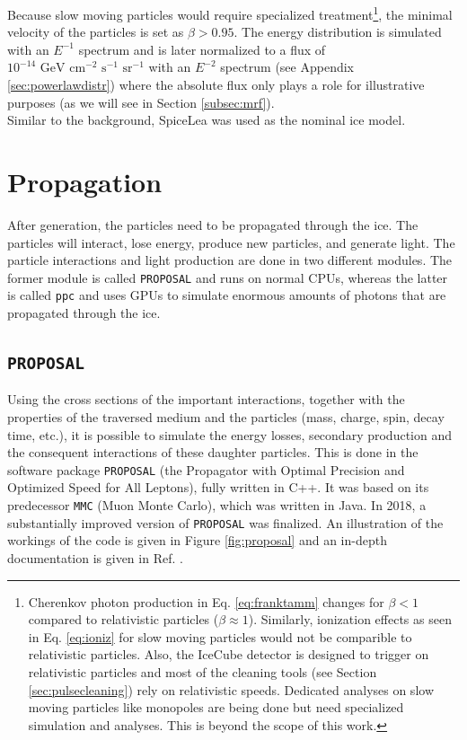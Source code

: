 \noindent Because slow moving particles would require specialized treatment\footnote{Cherenkov photon production in Eq. \ref{eq:franktamm} changes for $\beta < 1$ compared to relativistic particles ($\beta \approx 1$). Similarly, ionization effects as seen in Eq. \ref{eq:ioniz} for slow moving particles would not be comparible to relativistic particles. Also, the IceCube detector is designed to trigger on relativistic particles and most of the cleaning tools (see Section \ref{sec:pulsecleaning}) rely on relativistic speeds. Dedicated analyses on slow moving particles like monopoles are being done but need specialized simulation and analyses. This is beyond the scope of this work.}, the minimal velocity of the particles is set as $\beta > 0.95$. The energy distribution is simulated with an $E^{-1}$ spectrum and is later normalized to a flux of $10^{-14} \textrm{ GeV } \textrm{cm}^{-2} \textrm{ s}^{-1} \textrm{ sr}^{-1}$ with an $E^{-2}$ spectrum (see Appendix \ref{sec:powerlawdistr}) where the absolute flux only plays a role for illustrative purposes (as we will see in Section \ref{subsec:mrf}).\\

\noindent Similar to the background, SpiceLea was used as the nominal ice model.

\section{Propagation}
After generation, the particles need to be propagated through the ice. The particles will interact, lose energy, produce new particles, and generate light. The particle interactions and light production are done in two different modules. The former module is called \texttt{PROPOSAL} and runs on normal CPUs, whereas the latter is called \texttt{ppc} and uses GPUs to simulate enormous amounts of photons that are propagated through the ice.


\subsection{\texttt{PROPOSAL}}
Using the cross sections of the important interactions, together with the properties of the traversed medium and the particles (mass, charge, spin, decay time, etc.), it is possible to simulate the energy losses, secondary production and the consequent interactions of these daughter particles. This is done in the software package \texttt{PROPOSAL}  (the Propagator with Optimal Precision and Optimized Speed for All Leptons), fully written in C++. It was based on its predecessor \texttt{MMC} (Muon Monte Carlo), which was written in Java. In 2018, a substantially improved version of \texttt{PROPOSAL} was finalized. An illustration of the workings of the code is given in Figure \ref{fig:proposal} and an in-depth documentation is given in Ref. \cite{Dunsch:2018nsc}.

